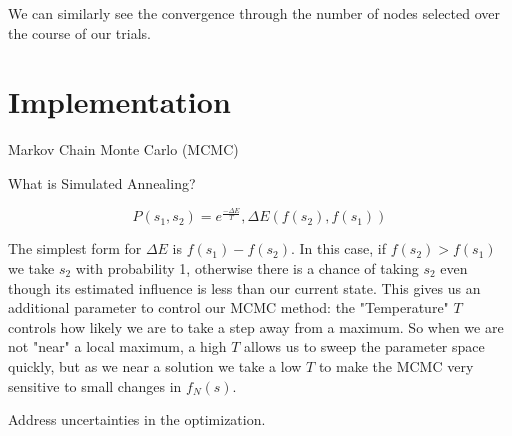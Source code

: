 \documentclass{article}
\begin{document}
		We can similarly see the convergence through the number of nodes selected over the course of our trials.\\


		
	\section{Implementation}
		
	Markov Chain Monte Carlo (MCMC)
		
	What is Simulated Annealing?
		
		\begin{equation}
		\boxed{
			P(s_1,s_2) = e^\frac{-\Delta E}{T}, \Delta E(f(s_2),f(s_1))
		}
		\end{equation}
		
		The simplest form for $\Delta E$ is $f(s_1) - f(s_2)$. In this case, if $f(s_2) > f(s_1)$ we take $s_2$ with probability 1, otherwise there is a chance of taking $s_2$ even though its estimated influence is less than our current state. This gives us an additional parameter to control our MCMC method: the "Temperature" $T$ controls how likely we are to take a step away from a maximum. So when we are not "near" a local maximum, a high $T$ allows us to sweep the parameter space quickly, but as we near a solution we take a low $T$ to make the MCMC very sensitive to small changes in $f_N(s)$.
	
	Address uncertainties in the optimization.
	
	
\end{document}
